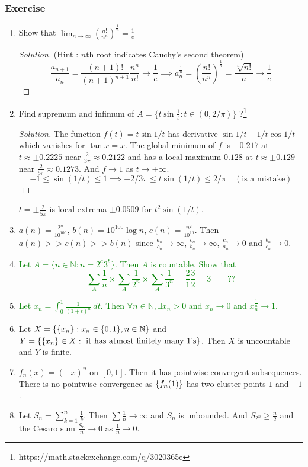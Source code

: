 \subsubsection*{Exercise} %
\begin{enumerate}
	\item Show that $\displaystyle \lim_{n \to \infty} \left( \frac{n!}{n^n} \right)^\frac{1}{n} = \frac{1}{e}$ 
		\begin{proof}[Solution] (Hint : $n$th root indicates Cauchy's second theorem)
			$$ \frac{a_{n+1}}{a_n} = \frac{(n+1)!}{(n+1)^{n+1}} \frac{n^n}{n!} \to \frac{1}{e} \implies a_n^\frac{1}{n} = \left(\frac{n!}{n^n}\right)^\frac{1}{n} = \frac{\sqrt[n]{n!}}{n} \to \frac{1}{e} $$
		\end{proof}
	\item Find supremum and infimum of $A = \{ t \sin \frac{1}{t} : t \in (0,2/\pi) \}$ ?\footnote{https://math.stackexchange.com/q/3020365e}
	\begin{proof}[Solution]
		The function $f(t) =  t \sin 1/t$ has derivative $\sin 1/t - 1/t \cos 1/t$ which vanishes for $\tan x = x$.
		The global minimum of $f$ is $-0.217$ at $t \approx \pm 0.2225$ near $\frac{2}{3\pi} \approx 0.2122$ and has a local maximum $0.128$ at $t \approx \pm 0.129$ near $\frac{2}{5\pi} \approx 0.1273$. And $f \to 1$ as $t \to \pm \infty$.
		$$-1 \le \sin (1/t) \le 1 \implies -2/3\pi \le t \sin(1/t) \le 2/\pi \quad (\text{is a mistake})$$
	\end{proof}
		\subitem $t = \pm \frac{2}{5\pi}$ is local extrema $\pm 0.0509$ for $t^2 \sin (1/t)$.
	\item $a(n) = \frac{2^n}{10^{100}}$, $b(n) = 10^{100}\log n$, $c(n) = \frac{n^2}{10^{10}}$. Then $a(n) >> c(n) >> b(n)$ since $\frac{a_n}{c_n} \to \infty$, $\frac{c_n}{b_n} \to \infty$, $\frac{c_n}{a_n} \to 0$ and $\frac{b_n}{c_n} \to 0$.
	\item \textcolor{green}{Let $A = \{ n \in \mathbb{N} : n = 2^a3^b \}$. Then $A$ is countable. Show that $$\sum_A \frac{1}{n} \times \sum_A \frac{1}{2^n} \times  \sum_A \frac{1}{3^n} = \frac{2}{1} \frac{3}{2} = 3 \qquad ??$$}
	\item \textcolor{green}{Let $x_n = \int_0^1 \frac{1}{(1+t)^n}\ dt$. Then $\forall n \in \mathbb{N}, \exists x_n > 0$ and $x_n \to 0$ and $x_n^{\frac{1}{n}} \to 1$.}
	\item Let $X = \{ \{x_n\} : x_n \in \{0,1\}, n \in \mathbb{N} \}$ and $Y = \{ \{x_n\} \in X : \text{ it has atmost finitely many $1$'s} \}$. Then $X$ is uncountable and $Y$ is finite.
	\item $f_n(x) = (-x)^n$ on $[0,1]$. Then it has pointwise convergent subsequences. There is no pointwise convergence as $\{f_n(1)\}$ has two cluster points $1$ and $-1$.
	\item Let $S_n = \sum_{k=1}^n \frac{1}{k}$. Then $\sum \frac{1}{n} \to \infty$ and $S_n$ is unbounded. And $S_{2^n} \ge \frac{n}{2}$ and the Cesaro sum $\frac{S_n}{n} \to 0$ as $\frac{1}{n} \to 0$.
\end{enumerate}

